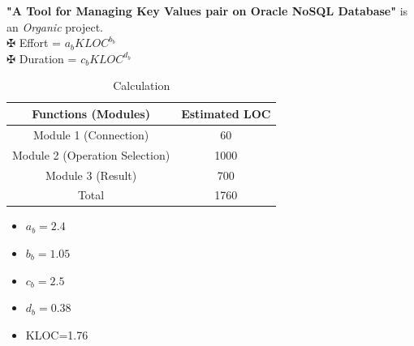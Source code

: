 \textbf{"A Tool for Managing Key Values pair on Oracle NoSQL Database"} is an \emph{Organic} project. \\

\hspace*{0.7in} $\maltese$  Effort = $a_{b}KLOC^{b_{b}} $ \\
\hspace*{0.7in} $\maltese$  Duration = $ c_{b}KLOC^{d_{b}} $ \\

\begin{table}[h]
\begin{flushleft}
\centering
\caption{Calculation} \label{Calculation}
\begin{tabular}{|c|c|} \hline
Functions (Modules) & Estimated LOC  \\ \hline
Module 1 (Connection) & 60 \\ \hline
Module 2 (Operation Selection) & 1000 \\ \hline
Module 3 (Result) & 700 \\ \hline
Total & 1760 \\ \hline
 \end{tabular}
 \end{flushleft}
 \end{table}

 \begin{itemize}
   \item $a_{b}=2.4$
   \item $b_{b}=1.05$
   \item $c_{b}=2.5$
   \item $d_{b}=0.38$
   \item KLOC=1.76
\end{itemize}

